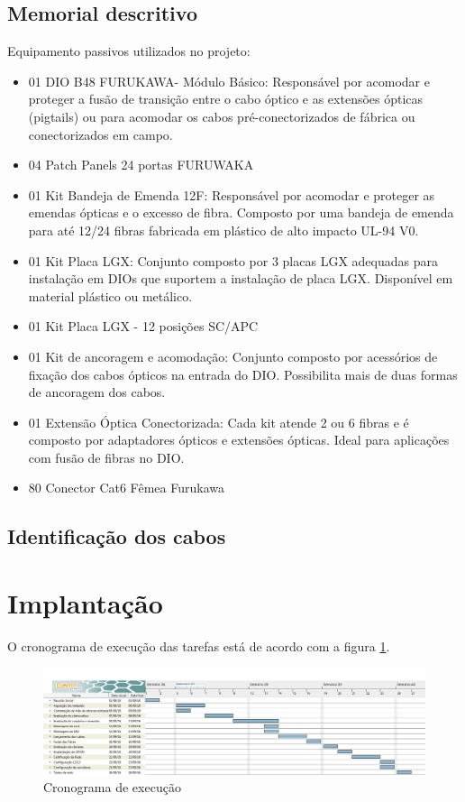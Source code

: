 \documentclass[	DIV=calc,%
							paper=a4,%
							fontsize=12pt,%
							onecolumn]{scrartcl}	 					%
\begin{document}
\subsection{Memorial descritivo}
Equipamento passivos utilizados no projeto:
\begin{itemize}
	\item 01 DIO B48  FURUKAWA- Módulo Básico: Responsável por acomodar e proteger a fusão de transição entre o cabo óptico e as extensões ópticas (pigtails) ou para acomodar os cabos pré-conectorizados de fábrica ou conectorizados em campo.  
	\item 04 Patch Panels 24 portas FURUWAKA
	\item 01 Kit Bandeja de Emenda 12F: Responsável por acomodar e proteger as emendas ópticas e o excesso de fibra. Composto por uma bandeja de emenda para até 12/24 fibras fabricada em plástico de alto impacto UL-94 V0.
	\item 01 Kit Placa LGX: Conjunto composto por 3 placas LGX adequadas para instalação em DIOs que suportem a instalação de placa LGX. Disponível em material plástico ou metálico.
	\item 01 Kit Placa LGX - 12 posições SC/APC
	\item 01 Kit de ancoragem e acomodação: Conjunto composto por acessórios de fixação dos cabos ópticos na entrada do DIO. Possibilita mais de duas formas de ancoragem dos cabos.
	\item 01 Extensão Óptica Conectorizada: Cada kit atende 2 ou 6 fibras e é composto por adaptadores ópticos e extensões ópticas. Ideal para aplicações com fusão de fibras no DIO.
	\item 80 Conector Cat6 Fêmea Furukawa
\end{itemize}

\subsection{Identificação dos cabos}

\section{Implantação}
O cronograma de execução das tarefas está de acordo com a figura \ref{tarefas}.

\begin{figure}
\centering
\includegraphics[width=\textwidth]{tarefas}
\caption{Cronograma de execução}
\label{tarefas}
\end{figure}
\end{document}
